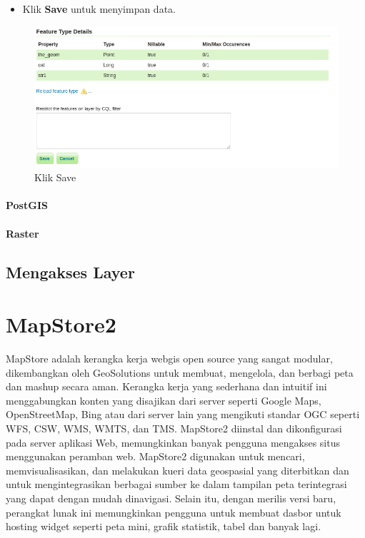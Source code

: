 \documentclass[]{book}
\providecommand{\tightlist}{%
  \setlength{\itemsep}{0pt}\setlength{\parskip}{0pt}}
\begin{document}
\begin{itemize}
\tightlist
\item
  Klik \textbf{Save} untuk menyimpan data.
\end{itemize}

\begin{figure}

{\centering \includegraphics[width=0.6\linewidth]{images/08/gs17c} 

}

\caption{Klik Save}\label{fig:gs17c}
\end{figure}

\hypertarget{postgis}{%
\subsubsection{PostGIS}\label{postgis}}

\hypertarget{raster}{%
\subsubsection{Raster}\label{raster}}

\hypertarget{mengakses-layer}{%
\section{Mengakses Layer}\label{mengakses-layer}}

\hypertarget{hari_kedelapan}{%
\chapter{MapStore2}\label{hari_kedelapan}}

MapStore adalah kerangka kerja webgis open source yang sangat modular, dikembangkan oleh GeoSolutions untuk membuat, mengelola, dan berbagi peta dan mashup secara aman. Kerangka kerja yang sederhana dan intuitif ini menggabungkan konten yang disajikan dari server seperti Google Maps, OpenStreetMap, Bing atau dari server lain yang mengikuti standar OGC seperti WFS, CSW, WMS, WMTS, dan TMS. MapStore2 diinstal dan dikonfigurasi pada server aplikasi Web, memungkinkan banyak pengguna mengakses situs menggunakan peramban web. MapStore2 digunakan untuk mencari, memvisualisasikan, dan melakukan kueri data geospasial yang diterbitkan dan untuk mengintegrasikan berbagai sumber ke dalam tampilan peta terintegrasi yang dapat dengan mudah dinavigasi. Selain itu, dengan merilis versi baru, perangkat lunak ini memungkinkan pengguna untuk membuat dasbor untuk hosting widget seperti peta mini, grafik statistik, tabel dan banyak lagi.
\end{document}
